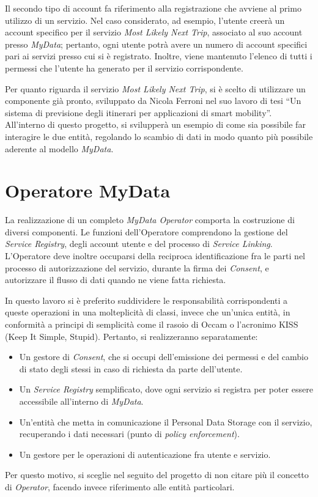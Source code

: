Il secondo tipo di account fa riferimento alla registrazione che avviene al primo utilizzo di un servizio. Nel caso considerato, ad esempio, l’utente creer\`a un account specifico per il servizio \textit{Most Likely Next Trip}, associato al suo account presso \textit{MyData}; pertanto, ogni utente potr\`a avere un numero di account specifici pari ai servizi presso cui si \`e registrato. Inoltre, viene mantenuto l’elenco di tutti i permessi che l’utente ha generato per il servizio corrispondente.

Per quanto riguarda il servizio \textit{Most Likely Next Trip}, si \`e scelto di utilizzare un componente gi\`a pronto, sviluppato da Nicola Ferroni nel suo lavoro di tesi “Un sistema di previsione degli itinerari per applicazioni di smart mobility”\cite{MLNT}.  All’interno di questo progetto, si svilupper\`a un esempio di come sia possibile far interagire le due entit\`a, regolando lo scambio di dati in modo quanto pi\`u possibile aderente al modello \textit{MyData}.

\section{Operatore MyData}
\label{sec:A-mydataop}
La realizzazione di un completo \textit{MyData Operator} comporta la costruzione di diversi componenti. Le funzioni dell’Operatore comprendono la gestione del \textit{Service Registry}, degli account utente e del processo di \textit{Service Linking}. L’Operatore deve inoltre occuparsi della reciproca identificazione fra le parti nel processo di autorizzazione del servizio, durante la firma dei \textit{Consent}, e autorizzare il flusso di dati quando ne viene fatta richiesta.

In questo lavoro si \`e preferito suddividere le responsabilit\`a corrispondenti a queste operazioni in una molteplicit\`a di classi, invece che un’unica entit\`a, in conformit\`a a principi di semplicit\`a come il rasoio di Occam o l’acronimo KISS (Keep It Simple, Stupid). Pertanto, si realizzeranno separatamente:
\begin{itemize}
	\item Un gestore di \textit{Consent}, che si occupi dell’emissione dei permessi e del cambio di stato degli stessi in caso di richiesta da parte dell’utente.
	\item Un \textit{Service Registry} semplificato, dove ogni servizio si registra per poter essere accessibile all’interno di \textit{MyData}.
	\item Un’entit\`a che metta in comunicazione il Personal Data Storage con il servizio, recuperando i dati necessari (punto di \textit{policy enforcement}).
	\item Un gestore per le operazioni di autenticazione fra utente e servizio.
\end{itemize}
Per questo motivo, si sceglie nel seguito del progetto di non citare pi\`u il concetto di \textit{Operator}, facendo invece riferimento alle entit\`a particolari.

